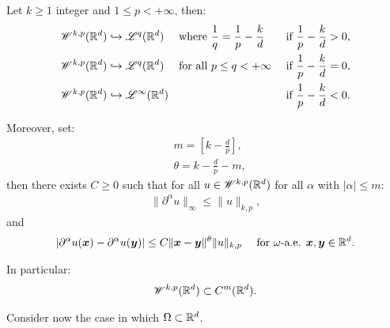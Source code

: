 \begin{corollary} \label{corollary:embedding}
    Let $k \geq 1$ integer and $1 \leq p < +\infty$, then:
    \begin{align}
        \mathscr{W}^{k, p}(\mathbb{R}^{d}) & \hookrightarrow \mathscr{L}^{q}(\mathbb{R}^{d}) \quad \text{ where } \frac{1}{q} = \frac{1}{p} - \frac{k}{d} & \text{ if } \frac{1}{p} - \frac{k}{d} > 0, \\
        \mathscr{W}^{k, p}(\mathbb{R}^{d}) & \hookrightarrow \mathscr{L}^{q}(\mathbb{R}^{d}) \quad \text{ for all } p \leq q < +\infty & \text{ if } \frac{1}{p} - \frac{k}{d} = 0, \\
        \mathscr{W}^{k, p}(\mathbb{R}^{d}) & \hookrightarrow \mathscr{L}^{\infty}(\mathbb{R}^{d}) & \text{ if } \frac{1}{p} - \frac{k}{d} < 0.
    \end{align}

    Moreover, set:
    \begin{align}
        & m = \left[ k - \frac{d}{p} \right], \\
        & \theta = k - \frac{d}{p} - m,
    \end{align}
    then there exists $C \geq 0$ such that for all $u \in \mathscr{W}^{k, p}(\mathbb{R}^{d})$ for all $\alpha$ with $\lvert \alpha \rvert \leq m$:
    \begin{gather}
        \lVert \partial^{\alpha} u \rVert_{\infty} \leq \lVert u \rVert_{k, p},
    \end{gather}
    and
    \begin{gather}
        \lvert \partial^{\alpha} u(\bm{x}) - \partial^{\alpha} u(\bm{y}) \rvert \leq C \lVert \bm{x} - \bm{y} \rVert^{\theta} \lVert u \rVert_{k, p} \quad \text{ for } \omega \text{-a.e. } \bm{x}, \bm{y} \in \mathbb{R}^{d}.
    \end{gather}

    In particular:
    \begin{gather}
        \mathscr{W}^{k, p}(\mathbb{R}^{d}) \subset C^m(\mathbb{R}^{d}).
    \end{gather}
\end{corollary}

Consider now the case in which $\Omega \subset \mathbb{R}^{d}$.

